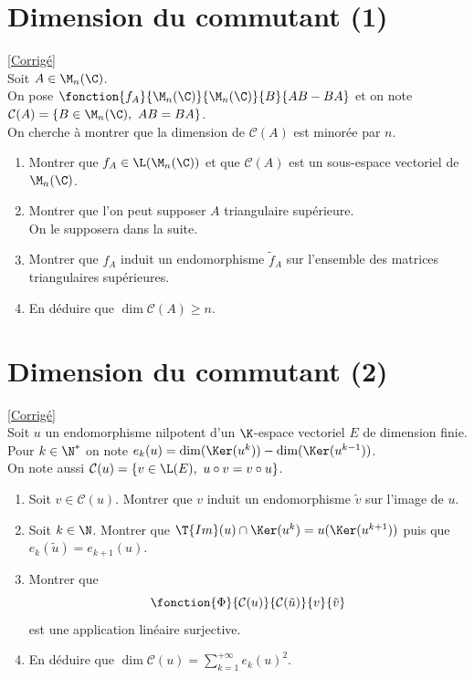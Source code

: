 \documentclass[8pt]{book}
\begin{document}
\section{Dimension du commutant (1) }
\label{Dimension du commutant (1)}
\textcolor{blue}{\hyperref[Dimension du commutant (1) corrigé]{[Corrigé]}}\\
Soit $A\in \M_n(\C)$.\\
On pose $\fonction{f_A}{\M_n(\C)}{\M_n(\C)}{B}{AB-BA}$ et on note $\mathcal C(A)=\{B\in \M_n(\C),\ AB=BA\}$.\\
On cherche à montrer que la dimension de $\mathcal C(A)$ est minorée par $n$.
\begin{enumerate}
	\item Montrer que $f_A\in \L(\M_n(\C))$ et que $\mathcal C(A)$ est un sous-espace vectoriel de $\M_n(\C)$.
	\item Montrer que l'on peut supposer $A$ triangulaire supérieure.\\
	On le supposera dans la suite.
	\item Montrer que $f_A$ induit un endomorphisme $\tilde f_A$ sur l'ensemble des matrices triangulaires supérieures.
	\item En déduire que $\dim\mathcal C(A)\geq n$.
\end{enumerate}
	
\section{Dimension du commutant (2) }
\label{Dimension du commutant (2)}
\textcolor{blue}{\hyperref[Dimension du commutant (2) corrigé]{[Corrigé]}}\\
Soit $u$ un endomorphisme nilpotent d'un $\K$-espace vectoriel $E$ de dimension finie.\\
Pour $k\in \N^*$ on note $e_k(u)=\dim(\Ker(u^k))-\dim(\Ker(u^{k-1}))$.\\
On note aussi $\mathcal C(u)=\{v\in \L(E),\ u\circ v=v\circ u\}$.
\begin{enumerate}
	\item Soit $v\in \mathcal C(u)$. Montrer que $v$ induit un endomorphisme $\tilde v$ sur l'image de $u$.
	\item Soit $k\in \N$. Montrer que $\T{Im}(u)\cap\Ker(u^k)=u(\Ker(u^{k+1}))$ puis que $e_k(\tilde u)=e_{k+1}(u)$.
	\item Montrer que
	$$\fonction{\Phi}{\mathcal C(u)}{\mathcal C(\tilde u)}{v}{\tilde v}$$
	est une application linéaire surjective.
	\item En déduire que $\dim\mathcal C(u)=\displaystyle\sum_{k=1}^{+\infty}e_k(u)^2$.
\end{enumerate}
\end{document}

